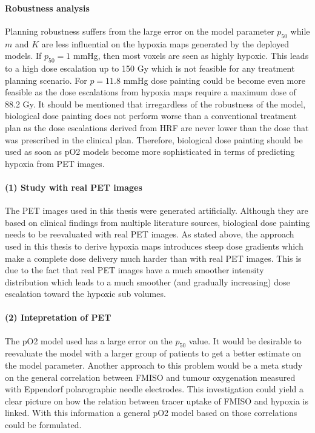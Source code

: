 \paragraph{Robustness analysis} Planning robustness suffers from the large error on the model parameter $p_{50}$ while $m$ and $K$ are less influential on the hypoxia maps generated by the deployed models. If $p_{50} = 1$ mmHg, then most voxels are seen as highly hypoxic. This leads to a high dose escalation up to 150 Gy which is not feasible for any treatment planning scenario. For $p=11.8$ mmHg dose painting could be become even more feasible as the dose escalations from hypoxia maps require a maximum dose of 88.2 Gy. It should be mentioned that irregardless of the robustness of the model, biological dose painting does not perform worse than a conventional treatment plan as the dose escalations derived from HRF are never lower than the dose that was prescribed in the clinical plan. Therefore, biological dose painting should be used as soon as pO2 models become more sophisticated in terms of predicting hypoxia from PET images.
\paragraph{(1) Study with real PET images} The PET images used in this thesis were generated artificially. Although they are based on clinical findings from multiple literature sources, biological dose painting needs to be reevaluated with real PET images. As stated above, the approach used in this thesis to derive hypoxia maps introduces steep dose gradients which make a complete dose delivery much harder than with real PET images. This is due to the fact that real PET images have a much smoother intensity distribution which leads to a much smoother (and gradually increasing) dose escalation toward the hypoxic sub volumes.
\paragraph{(2) Intepretation of PET} The pO2 model used has a large error on the $p_{50}$ value. It would be desirable to reevaluate the model with a larger group of patients to get a better estimate on the model parameter. Another approach to this problem would be a meta study on the general correlation between FMISO and tumour oxygenation measured with Eppendorf polarographic needle electrodes. This investigation could yield a clear picture on how the relation between tracer uptake of FMISO and hypoxia is linked. With this information a general pO2 model based on those correlations could be formulated.
